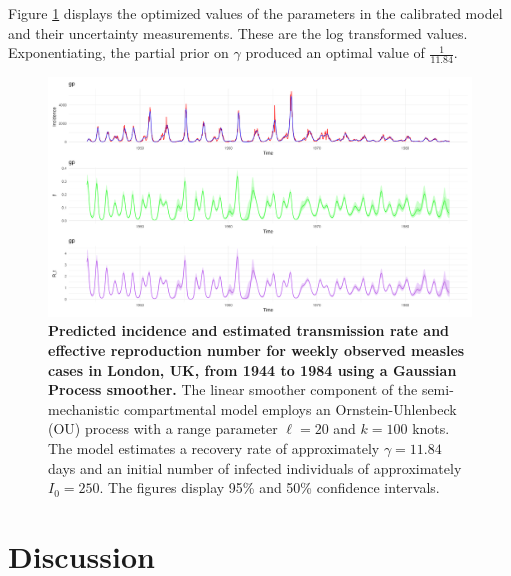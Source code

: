 \documentclass[
11pt, %
oneside, %
english, %
singlespacing, %
]{macthesis} %
\begin{document}
Figure \ref{fig:Measles_trans} displays the optimized values of the parameters in the calibrated model and their uncertainty measurements. These are the log transformed values. Exponentiating, the partial prior on \(\gamma\) produced an optimal value of \(\frac{1}{11.84}\).

\begin{figure}
\centering
\includegraphics[width=\textwidth, height = \textwidth]{figure/Measles/Measles_combined_plot.png}
\caption[Combined Analysis of Measles in London, UK, (1944-1984)]{\textbf{Predicted incidence and estimated transmission rate and effective reproduction number for weekly observed measles cases in London, UK, from 1944 to 1984 using a Gaussian Process smoother.} The linear smoother component of the semi-mechanistic compartmental model employs an Ornstein-Uhlenbeck (OU) process with a range parameter \(\ell = 20\) and \(k = 100\) knots. The model estimates a recovery rate of approximately \(\gamma = 11.84\) days and an initial number of infected individuals of approximately \(I_0 = 250\). The figures display 95\% and 50\% confidence intervals.}
\label{fig:Measles_trans}
\end{figure}

\chapter{Discussion}\label{Discussion}
\end{document}

